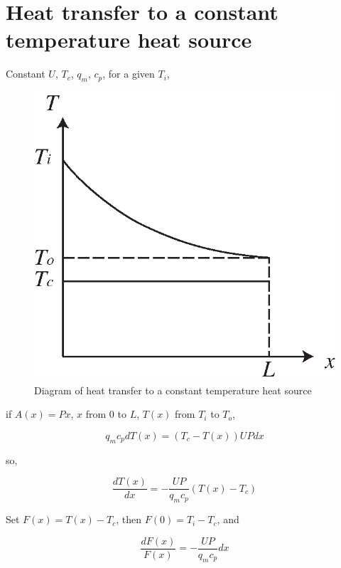 \documentclass{article}
\begin{document}
\clearpage
\appendix

\section{\noindent \label{sec:CTHT}Heat transfer to a constant temperature heat source}

Constant $U$, $T_{c}$, $q_{m}$, $c_{p}$, for a given $T_{i}$,

\noindent \begin{center}
\begin{figure}[h]
\begin{centering}
\includegraphics[width=0.6\columnwidth]{graphics/ConstTempHX}
\par\end{centering}

\protect\caption{\label{fig:CTHX}Diagram of heat transfer to a constant temperature heat source}
\end{figure}

\par\end{center}

if $A(x)=Px$, $x$ from $0$ to $L$, $T(x)$ from $T_{i}$ to $T_{o}$, 

\begin{equation*}
	q_{m}c_{p}dT(x)=(T_{c}-T(x))UPdx
\end{equation*}

so,

\begin{equation*}
	\frac{dT(x)}{dx}=-\frac{UP}{q_{m}c_{p}}(T(x)-T_{c})
\end{equation*}

Set $F(x)=T(x)-T_{c}$, then $F(0)=T_{i}-T_{c}$, and

\begin{equation*}
	\dfrac{dF(x)}{F(x)}=-\dfrac{UP}{q_{m}c_{p}}dx
\end{equation*}
\end{document}
